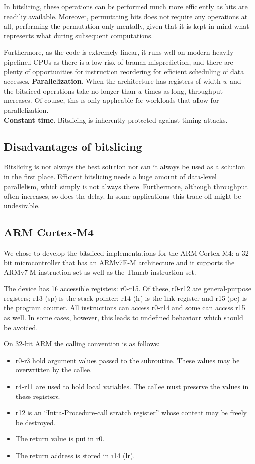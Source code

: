 \documentclass{report}
\begin{document}
In bitslicing, these operations can be performed much more efficiently as bits are readiliy available. Moreover, permutating bits does not require any operations at all, performing the permutation only mentally, given that it is kept in mind what represents what during subsequent computations.

Furthermore, as the code is extremely linear, it runs well on modern heavily pipelined CPUs as there is a low risk of branch misprediction, and there are plenty of opportunities for instruction reordering for efficient scheduling of data accesses.
\newpage
\noindent\textbf{Parallelization.} When the architecture has registers of width $w$ and the bitsliced operations take no longer than $w$ times as long, throughput increases. Of course, this is only applicable for workloads that allow for parallelization.\\
\noindent\textbf{Constant time.} Bitslicing is inherently protected against timing attacks.\\

\subsection{Disadvantages of bitslicing}
Bitslicing is not always the best solution nor can it always be used as a solution in the first place. Efficient bitslicing needs a huge amount of data-level parallelism, which simply is not always there. Furthermore, although throughput often increases, so does the delay. In some applications, this trade-off might be undesirable.

\subsection{ARM Cortex-M4}
We chose to develop the bitsliced implementations for the ARM Cortex-M4: a 32-bit microcontroller that has an ARMv7E-M architecture and it supports the ARMv7-M instruction set as well as the Thumb instruction set.\cite{cortexm4datasheet}

The device has 16 accessible registers: r0-r15. Of these, r0-r12 are general-purpose registers; r13 (sp) is the stack pointer; r14 (lr) is the link register and r15 (pc) is the program counter. All instructions can access r0-r14 and some can access r15 as well. In some cases, however, this leads to undefined behaviour which should be avoided.

On 32-bit ARM the calling convention is as follows:
\begin{itemize}
    \setlength\itemsep{0em}
    \item r0-r3 hold argument values passed to the subroutine. These values may be overwritten by the callee.
    \item r4-r11 are used to hold local variables. The callee must preserve the values in these registers.
    \item r12 is an ``Intra-Procedure-call scratch register'' whose content may be freely be destroyed.
    \item The return value is put in r0.
    \item The return address is stored in r14 (lr).
\end{itemize}
\end{document}
